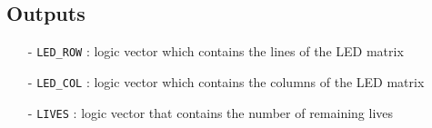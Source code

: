 \subsection{Outputs}
\begin{itemize}
    \item[-] \texttt{LED\_ROW} : logic vector which contains the lines of the LED matrix
    \item[-] \texttt{LED\_COL} : logic vector which contains the columns of the LED matrix
    \item[-] \texttt{LIVES} : logic vector that contains the number of remaining lives
\end{itemize}